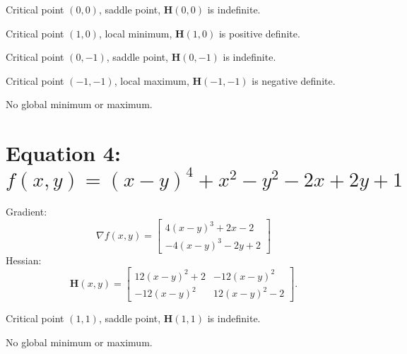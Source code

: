 \documentclass[letterpaper,10pt]{article}
\begin{document}
Critical point $(0, 0)$, saddle point, $\mathbf{H}(0, 0)$
is indefinite.

Critical point $(1, 0)$, local minimum,
$\mathbf{H}(1, 0)$ is positive definite.

Critical point $(0, -1)$,
saddle point, $\mathbf{H}(0, -1)$ is indefinite.

Critical point $(-1, -1)$, local maximum, $\mathbf{H}(-1, -1)$ is negative
definite.

No global minimum or maximum.

\section*{Equation 4: $f(x, y) = (x - y)^4 + x^2 - y^2 -2x + 2y + 1$}
Gradient:
$$\nabla f(x, y) = \begin{bmatrix}
    4(x-y)^3 + 2x - 2 \\
    -4(x-y)^3 - 2y + 2 \end{bmatrix}$$
Hessian:
$$\mathbf{H}(x,y) = \begin{bmatrix}
    12(x-y)^2 + 2 & -12(x-y)^2 \\
    -12(x-y)^2 & 12(x-y)^2 - 2 \end{bmatrix}.$$
    
Critical point $(1, 1)$, saddle point, $\mathbf{H}(1,1)$ is
indefinite.

No global minimum or maximum.

 
\end{document}
